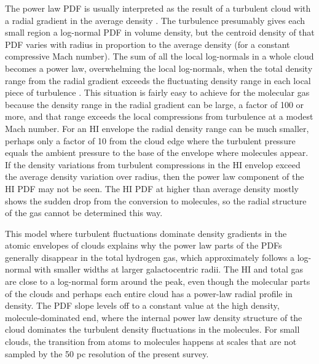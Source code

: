 \documentclass{aa}
\begin{document}
The power law PDF is usually interpreted as the result of a turbulent cloud with a
radial gradient in the average density \citep{klessen00,vaz08,kritsuk11}. The
turbulence presumably gives each small region a log-normal PDF in volume density,
but the centroid density of that PDF varies with radius in proportion to the
average density (for a constant compressive Mach number). The sum of all the local
log-normals in a whole cloud becomes a power law, overwhelming the local
log-normals, when the total density range from the radial gradient exceeds the
fluctuating density range in each local piece of turbulence \citep{elmegreen11}.
This situation is fairly easy to achieve for the molecular gas because the density
range in the radial gradient can be large, a factor of 100 or more, and that range
exceeds the local compressions from turbulence at a modest Mach number.  For an HI
envelope the radial density range can be much smaller, perhaps only a factor of 10
from the cloud edge where the turbulent pressure equals the ambient pressure to
the base of the envelope where molecules appear.   If the density variations from
turbulent compressions in the HI envelop exceed the average density variation over
radius, then the power law component of the HI PDF may not be seen.  The HI PDF at
higher than average density mostly shows the sudden drop from the conversion to
molecules, so the radial structure of the gas cannot be determined this way.

This model where turbulent fluctuations dominate density gradients in the
atomic envelopes of clouds explains why the power law parts of the PDFs
generally disappear in the total hydrogen gas, which  approximately follows
a log-normal with smaller widths at larger galactocentric radii. The HI and total
gas are close to a log-normal form around the peak, even though the molecular
parts of the clouds and perhaps each entire cloud has a power-law radial profile
in density. The PDF slope levels off to a constant value at the high density, 
molecule-dominated end, where the  internal power law density structure of
the cloud dominates the turbulent density fluctuations in the molecules.  For
small clouds, the transition from atoms to molecules happens at scales that are
not sampled by the 50 pc resolution of the present survey.  
\end{document}
